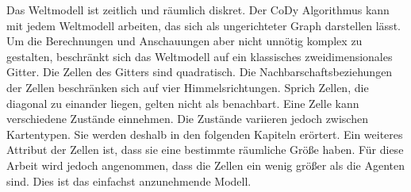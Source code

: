 Das Weltmodell ist zeitlich und räumlich diskret. Der CoDy Algorithmus kann mit jedem Weltmodell arbeiten, das sich als ungerichteter Graph darstellen lässt. Um die Berechnungen und Anschauungen aber nicht unnötig komplex zu gestalten, beschränkt sich das Weltmodell auf ein klassisches zweidimensionales Gitter. Die Zellen des Gitters sind quadratisch. Die Nachbarschaftsbeziehungen der Zellen beschränken sich auf vier Himmelsrichtungen. Sprich Zellen, die diagonal zu einander liegen, gelten nicht als benachbart. Eine Zelle kann verschiedene Zustände einnehmen. Die Zustände variieren jedoch zwischen Kartentypen. Sie werden deshalb in den folgenden Kapiteln erörtert. Ein weiteres Attribut der Zellen ist, dass sie eine bestimmte räumliche Größe haben. Für diese Arbeit wird jedoch angenommen, dass die Zellen ein wenig größer als die Agenten sind. Dies ist das einfachst anzunehmende Modell. \cite{book:regele}